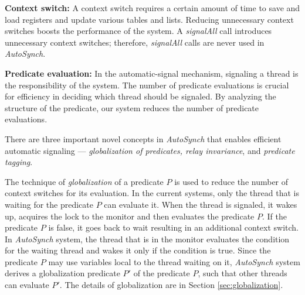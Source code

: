 \documentclass{sigplanconf}
\begin{document}
\begin{description}
    \item{\bf Context switch:} A context switch requires a certain 
        amount of time to save and load registers and update various tables and
        lists. Reducing unnecessary context switches boosts the performance of the system.
        A {\em signalAll} call introduces unnecessary context switches; therefore,
        {\em signalAll} calls are never used in {\em AutoSynch}. 
    \item {\bf Predicate evaluation:} In the 
        automatic-signal mechanism, signaling a thread is the 
        responsibility of the system. The number of predicate evaluations is 
        crucial for efficiency in deciding which thread should be signaled. 
        By analyzing the structure of the predicate, our system reduces the number of predicate evaluations.
\end{description}


There are three important novel concepts in {\em AutoSynch} that enables efficient automatic
signaling --- {\em globalization of predicates, relay invariance}, and {\em predicate
tagging}.

The technique of {\em globalization} of a predicate $P$ is used to reduce the number of 
context switches for its evaluation. In the current systems, only the thread that is waiting
for the predicate $P$ can evaluate it. When the thread is signaled, it wakes up, acquires the
lock to the monitor and then evaluates the predicate $P$. If the predicate $P$ is false, it
goes back to wait resulting in an additional context switch. In {\em AutoSynch} system, the thread
that is in the monitor evaluates the condition for the waiting thread and wakes it only
if the condition is true. Since the predicate $P$ may use variables local to the thread
waiting on it, {\em AutoSynch} system derives a globalization predicate $P'$ of
the predicate $P$, such that other threads can evaluate $P'$. 
The details of globalization are in Section \ref{sec:globalization}.

\end{document}
